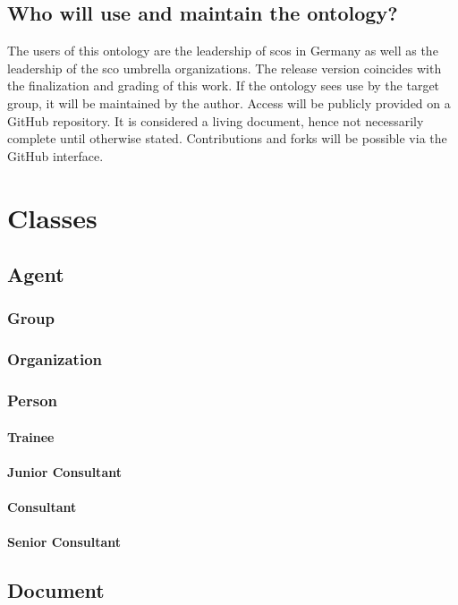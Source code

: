 \documentclass[a4paper, DIV=13, BCOR=0cm]{scrbook}
\begin{document}
\subsection{Who will use and maintain the ontology?}
The users of this ontology are the leadership of \glspl{sco} in Germany as well as the leadership of the \gls{sco} umbrella organizations. The release version coincides with the finalization and grading of this work. If the ontology sees use by the target group, it will be maintained by the author. Access will be publicly provided on a GitHub repository. It is considered a living document, hence not necessarily complete until otherwise stated. Contributions and forks will be possible via the GitHub interface.

\section{Classes}
\subsection{Agent}
\subsubsection{Group}
\subsubsection{Organization}
\subsubsection{Person}
\paragraph{Trainee}
\paragraph{Junior Consultant}
\paragraph{Consultant}
\paragraph{Senior Consultant}

\subsection{Document}
\end{document}
